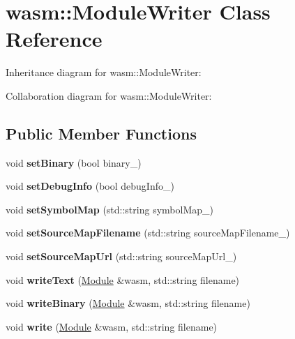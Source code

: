 \hypertarget{classwasm_1_1_module_writer}{}\section{wasm\+:\+:Module\+Writer Class Reference}
\label{classwasm_1_1_module_writer}


Inheritance diagram for wasm\+:\+:Module\+Writer\+:


Collaboration diagram for wasm\+:\+:Module\+Writer\+:
\subsection*{Public Member Functions}
\begin{DoxyCompactItemize}
\item 
\mbox{\label{classwasm_1_1_module_writer_ad9bc2ef5568a936c56e6d109632c98b1}} 
void {\bfseries set\+Binary} (bool binary\+\_\+)
\item 
\mbox{\label{classwasm_1_1_module_writer_ad7f5962516b87aecf1112fe01b557240}} 
void {\bfseries set\+Debug\+Info} (bool debug\+Info\+\_\+)
\item 
\mbox{\label{classwasm_1_1_module_writer_a83de26f4b73ddd62b9097ab43e16f528}} 
void {\bfseries set\+Symbol\+Map} (std\+::string symbol\+Map\+\_\+)
\item 
\mbox{\label{classwasm_1_1_module_writer_af78cf03ea886f4def751da273fe09eeb}} 
void {\bfseries set\+Source\+Map\+Filename} (std\+::string source\+Map\+Filename\+\_\+)
\item 
\mbox{\label{classwasm_1_1_module_writer_afef5243a983faf803fdda359fe32bf9a}} 
void {\bfseries set\+Source\+Map\+Url} (std\+::string source\+Map\+Url\+\_\+)
\item 
\mbox{\label{classwasm_1_1_module_writer_aa8cd1e4d20ee26ba11b1c2caffa39653}} 
void {\bfseries write\+Text} (\mbox{\hyperlink{classwasm_1_1_module}{Module}} \&wasm, std\+::string filename)
\item 
\mbox{\label{classwasm_1_1_module_writer_a793b7b738d290da274a3754656ad335f}} 
void {\bfseries write\+Binary} (\mbox{\hyperlink{classwasm_1_1_module}{Module}} \&wasm, std\+::string filename)
\item 
\mbox{\label{classwasm_1_1_module_writer_a24a17c4ae84175c8a0d629a21dcb54d4}} 
void {\bfseries write} (\mbox{\hyperlink{classwasm_1_1_module}{Module}} \&wasm, std\+::string filename)
\end{DoxyCompactItemize}
